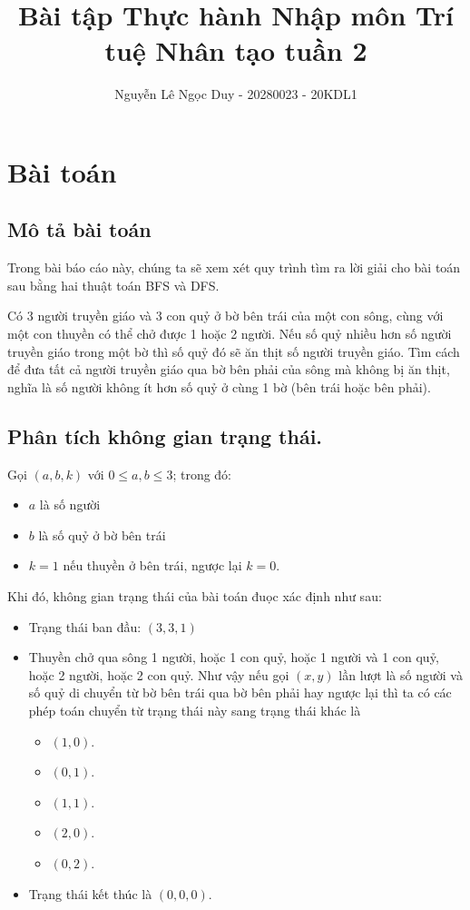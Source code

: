 \documentclass[a4paper, 11pt]{article}
\title{\textbf{Bài tập Thực hành Nhập môn Trí tuệ Nhân tạo tuần 2}}
\author{Nguyễn Lê Ngọc Duy - 20280023 - 20KDL1}
\date{}
\begin{document}
\maketitle
\hypersetup{linkcolor=black}
\tableofcontents

\pagebreak

\section{Bài toán}
\subsection{Mô tả bài toán}
Trong bài báo cáo này, chúng ta sẽ xem xét quy trình tìm ra lời giải cho bài toán sau bằng hai thuật toán BFS và DFS.

Có 3 người truyền giáo và 3 con quỷ ở bờ bên trái của một con sông, cùng với một con thuyền có thể chở được 1 hoặc 2 người. Nếu số quỷ nhiều hơn số người truyền giáo trong một bờ thì số quỷ đó sẽ ăn thịt số người truyền giáo. Tìm cách để đưa tất cả người truyền giáo qua bờ bên phải của sông mà không bị ăn thịt, nghĩa là số người không ít hơn số quỷ ở cùng 1 bờ (bên trái hoặc bên phải).

\subsection{Phân tích không gian trạng thái.}
Gọi $(a, b, k)$ với $0 \leq a, b \leq 3$; trong đó:
\begin{itemize}
    \item $a$ là số người
    \item $b$ là số quỷ ở bờ bên trái
    \item $k = 1$ nếu thuyền ở bên trái, ngược lại $k = 0$.
\end{itemize}
Khi đó, không gian trạng thái của bài toán đuọc xác định như sau:
\begin{itemize}
    \item Trạng thái ban đầu: $(3, 3, 1)$
    \item Thuyền chở qua sông 1 người, hoặc 1 con quỷ, hoặc 1 người và 1 con quỷ, hoặc 2 người, hoặc 2 con quỷ. Như vậy nếu gọi $(x, y)$ lần lượt là số người và số quỷ di chuyển từ bờ bên trái qua bờ bên phải hay ngược lại thì ta có các phép toán chuyển từ trạng thái này sang trạng thái khác là
    \begin{itemize}
        \item $(1, 0)$.
        \item $(0, 1)$.
        \item $(1, 1)$.
        \item $(2, 0)$.
        \item $(0, 2)$.
    \end{itemize}
    \item Trạng thái kết thúc là $(0, 0, 0)$.
\end{itemize}
\end{document}
